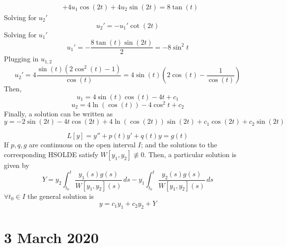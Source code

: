 \documentclass[twoside]{report}
\begin{document}
\begin{example}
\begin{equation}
\begin{alignedat}{1}
                &+4u_{1}\cos(2t)+4u_{2}\sin(2t) = 8\tan(t)
            \end{alignedat}
        \end{equation}
        Solving for $u_{2}'$
        \begin{equation}
            u_{2}' = -u_{1}'\cot(2t)
        \end{equation}
        Solving for $u_{1}'$
        \begin{equation}
            u_{1}' = -\frac{8\tan(t)\sin(2t)}{2} = -8\sin^{2}t
        \end{equation}
        Plugging in $u_{1,2}$
        \begin{equation}
            u_{2}' = 4\frac{\sin(t)(2\cos^{2}(t) - 1)}{\cos(t)} = 4\sin(t)\left(2\cos(t) - \frac{1}{\cos(t)}\right)
        \end{equation}
        Then,
        \begin{equation}
            u_{1} = 4\sin(t)\cos(t)-4t + c_{1}
        \end{equation}
        \begin{equation}
            u_{2} = 4\ln(\cos(t)) - 4\cos^{2}t + c_{2}
        \end{equation}
        Finally, a solution can be written as
        \begin{equation}
            y = -2\sin(2t) - 4t\cos(2t) + 4\ln(\cos(2t))\sin(2t) + c_{1}\cos(2t) + c_{2}\sin(2t)
        \end{equation}
    \end{example}
    \begin{btheorem}
        \begin{equation}
            L[y] = y'' + p(t)y' + q(t)y = g(t)
        \end{equation}
        If $p, q, g$ are continuous on the open interval $I$; and the solutions to the corresponding HSOLDE satisfy $W[y_{1}, y_{2}] \nequiv 0$. Then, a particular solution is given by
        \begin{equation}
            Y = y_{2}\int_{t_{0}}^{t}\frac{y_{1}(s)g(s)}{W[y_{1},y_{2}](s)}\,ds -y_{1}\int_{t_{0}}^{t}\frac{y_{2}(s)g(s)}{W[y_{1},y_{2}](s)}\,ds
        \end{equation}
        $\forall t_{0} \in I$ the general solution is
        \begin{equation}
            y = c_{1}y_{1} + c_{2}y_{2} + Y
        \end{equation}
    \end{btheorem}
    \chapter{3 March 2020}
\end{document}
